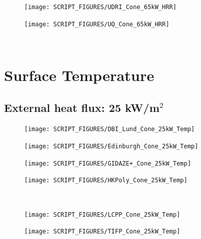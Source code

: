 \documentclass{book}
\begin{document}
\begin{landscape}
\begin{minipage}{0.65\textwidth}
\begin{figure}[H]
{\texttt{[image: SCRIPT\_FIGURES/UDRI\_Cone\_65kW\_HRR]}}\\
\end{figure}
\end{minipage}
\begin{minipage}{0.35\textwidth}
\begin{figure}[H]
{\texttt{[image: SCRIPT\_FIGURES/UQ\_Cone\_65kW\_HRR]}}\\
\end{figure}
\end{minipage}\\
\vfill 

\newpage
\section{Surface Temperature}
\label{Cone_Temp}
\subsection{External heat flux: 25 kW/m$^2$}
\begin{minipage}{0.65\textwidth}
\begin{figure}[H]
{\texttt{[image: SCRIPT\_FIGURES/DBI\_Lund\_Cone\_25kW\_Temp]}}\\
\end{figure}
\end{minipage}
\begin{minipage}{0.35\textwidth}
\begin{figure}[H]
{\texttt{[image: SCRIPT\_FIGURES/Edinburgh\_Cone\_25kW\_Temp]}}\\
\end{figure}
\end{minipage}
\vfill
\begin{minipage}{0.65\textwidth}
\begin{figure}[H]
{\texttt{[image: SCRIPT\_FIGURES/GIDAZE+\_Cone\_25kW\_Temp]}}\\
\end{figure}
\end{minipage}
\begin{minipage}{0.35\textwidth}
\begin{figure}[H]
{\texttt{[image: SCRIPT\_FIGURES/HKPoly\_Cone\_25kW\_Temp]}}\\
\end{figure}
\end{minipage}\\
\begin{minipage}{0.65\textwidth}
\begin{figure}[H]
{\texttt{[image: SCRIPT\_FIGURES/LCPP\_Cone\_25kW\_Temp]}}\\
\end{figure}
\end{minipage}
\begin{minipage}{0.35\textwidth}
\begin{figure}[H]
{\texttt{[image: SCRIPT\_FIGURES/TIFP\_Cone\_25kW\_Temp]}}\\
\end{figure}
\end{minipage}
\vfill


\end{landscape}
\end{document}
